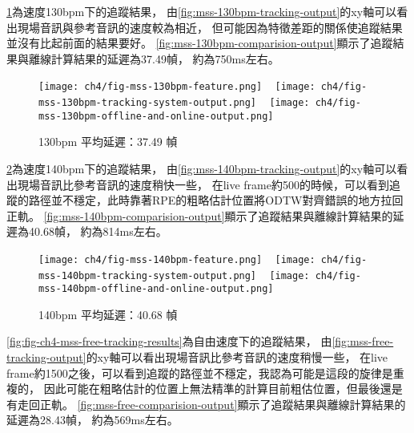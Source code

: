 \documentclass[class=NCU_thesis, crop=false]{standalone}
\begin{document}
\cref{fig:fig-ch4-mss-130bpm-tracking-results}為速度130bpm下的追蹤結果，
由\cref{fig:mss-130bpm-tracking-output}的xy軸可以看出現場音訊與參考音訊的速度較為相近，
但可能因為特徵差距的關係使追蹤結果並沒有比起前面的結果要好。
\cref{fig:mss-130bpm-comparision-output}顯示了追蹤結果與離線計算結果的延遲為37.49幀，
約為750ms左右。

\begin{figure}[H]
    \centering
    \subcaptionbox
    {
    \label{fig:mss-130bpm-feature}}
    {\texttt{[image: ch4/fig-mss-130bpm-feature.png]}}
    ~
    \subcaptionbox
    {
    \label{fig:mss-130bpm-tracking-output}}
    {\texttt{[image: ch4/fig-mss-130bpm-tracking-system-output.png]}}
    ~
    \subcaptionbox
    {
    \label{fig:mss-130bpm-comparision-output}}
    {\texttt{[image: ch4/fig-mss-130bpm-offline-and-online-output.png]}}
    \caption{130bpm 平均延遲：37.49 幀}
    \label{fig:fig-ch4-mss-130bpm-tracking-results}
\end{figure}

\cref{fig:fig-ch4-mss-140bpm-tracking-results}為速度140bpm下的追蹤結果，
由\cref{fig:mss-140bpm-tracking-output}的xy軸可以看出現場音訊比參考音訊的速度稍快一些，
在live frame約500的時候，可以看到追蹤的路徑並不穩定，此時靠著RPE的粗略估計位置將ODTW對齊錯誤的地方拉回正軌。
\cref{fig:mss-140bpm-comparision-output}顯示了追蹤結果與離線計算結果的延遲為40.68幀，
約為814ms左右。

\begin{figure}[H]
    \centering
    \subcaptionbox
    {
    \label{fig:mss-140bpm-feature}}
    {\texttt{[image: ch4/fig-mss-140bpm-feature.png]}}
    ~
    \subcaptionbox
    {
    \label{fig:mss-140bpm-tracking-output}}
    {\texttt{[image: ch4/fig-mss-140bpm-tracking-system-output.png]}}
    ~
    \subcaptionbox
    {
    \label{fig:mss-140bpm-comparision-output}}
    {\texttt{[image: ch4/fig-mss-140bpm-offline-and-online-output.png]}}
    \caption{140bpm 平均延遲：40.68 幀}
    \label{fig:fig-ch4-mss-140bpm-tracking-results}
\end{figure}

\cref{fig:fig-ch4-mss-free-tracking-results}為自由速度下的追蹤結果，
由\cref{fig:mss-free-tracking-output}的xy軸可以看出現場音訊比參考音訊的速度稍慢一些，
在live frame約1500之後，可以看到追蹤的路徑並不穩定，我認為可能是這段的旋律是重複的，
因此可能在粗略估計的位置上無法精準的計算目前粗估位置，但最後還是有走回正軌。
\cref{fig:mss-free-comparision-output}顯示了追蹤結果與離線計算結果的延遲為28.43幀，
約為569ms左右。
\end{document}
